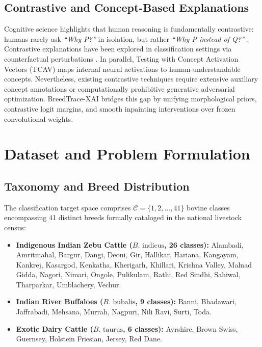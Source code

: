\documentclass[conference]{IEEEtran}
\begin{document}
\subsection{Contrastive and Concept-Based Explanations}
Cognitive science highlights that human reasoning is fundamentally contrastive: humans rarely ask \textit{``Why P?''} in isolation, but rather \textit{``Why P instead of Q?''} \cite{miller2019explanation}. Contrastive explanations have been explored in classification settings via counterfactual perturbations \cite{goyal2019counterfactual}. In parallel, Testing with Concept Activation Vectors (TCAV) \cite{kim2018tcav} maps internal neural activations to human-understandable concepts. Nevertheless, existing contrastive techniques require extensive auxiliary concept annotations or computationally prohibitive generative adversarial optimization. BreedTrace-XAI bridges this gap by unifying morphological priors, contrastive logit margins, and smooth inpainting interventions over frozen convolutional weights.

\section{Dataset and Problem Formulation}

\subsection{Taxonomy and Breed Distribution}
The classification target space comprises $\mathcal{C} = \{1, 2, \dots, 41\}$ bovine classes encompassing 41 distinct breeds formally cataloged in the national livestock census:
\begin{itemize}
    \item \textbf{Indigenous Indian Zebu Cattle ($B. \text{ indicus}$, 26 classes):} Alambadi, Amritmahal, Bargur, Dangi, Deoni, Gir, Hallikar, Hariana, Kangayam, Kankrej, Kasargod, Kenkatha, Kherigarh, Khillari, Krishna Valley, Malnad Gidda, Nagori, Nimari, Ongole, Pulikulam, Rathi, Red Sindhi, Sahiwal, Tharparkar, Umblachery, Vechur.
    \item \textbf{Indian River Buffaloes ($B. \text{ bubalis}$, 9 classes):} Banni, Bhadawari, Jaffrabadi, Mehsana, Murrah, Nagpuri, Nili Ravi, Surti, Toda.
    \item \textbf{Exotic Dairy Cattle ($B. \text{ taurus}$, 6 classes):} Ayrshire, Brown Swiss, Guernsey, Holstein Friesian, Jersey, Red Dane.
\end{itemize}
\end{document}

